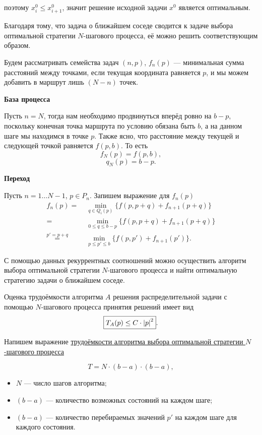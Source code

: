 поэтому $x_i^0 \le x_{i+1}^0$, значит решение исходной задачи $x^0$ является оптимальным.


Благодаря тому, что задача о ближайшем соседе сводится к задаче выбора оптимальной стратегии $N$-шагового процесса, её можно решить соответствующим образом.

Будем рассматривать семейства задач $(n, p)$, $f_n(p)$ --- минимальная сумма расстояний между точками, если текущая координата равняется $p$, и мы можем добавить в маршрут лишь $(N-n)$ точек.

\bigskip

\textbf{База процесса}

Пусть $n = N$, тогда нам необходимо продвинуться вперёд ровно на $b-p$, поскольку конечная точка маршрута по условию обязана быть $b$, а на данном шаге мы находимся в точке $p$. Также ясно, что расстояние между текущей и следующей точкой равняется $f(p, b)$. То есть 
\[
f_N(p) = f(p, b),
\]
\[
q_N(p) = b - p.
\]

\bigskip

\textbf{Переход}

Пусть $n = 1 \dots N-1$, $p \in P_n$. Запишем выражение для $f_n(p)$
\begin{align*}
	f_n(p) =& \; \min_{q \in Q_i(p)} \{f(p, p + q) + f_{n+1}(p+q)\} \\
	=& \; \min_{0 \le q \le b - p} \{f(p, p + q) + f_{n+1}(p+q)\} \\
	\stackrel{p' = p + q}{=}& \; \min_{p \le p' \le b} \{f(p, p') + f_{n+1}(p')\}.
\end{align*}

С помощью данных рекуррентных соотношений можно осуществить алгоритм выбора оптимальной стратегии $N$-шагового процесса и найти оптимальную стратегию задачи о ближайшем соседе.

\fact

Оценка трудоёмкости алгоритма $A$ решения распределительной задачи с помощью $N$-шагового процесса принятия решений имеет вид
\[
\boxed{T_A(p) \le C \cdot \abs{p}^2}.
\]

\prooof

Напишем выражение \hyperref[fact:n_step_complexity]{трудоёмкости алгоритма выбора оптимальной стратегии $N$-шагового процесса}

\[
T = N \cdot (b - a) \cdot (b - a),
\]

\begin{itemize}[nosep]
	\item $N$ --- число шагов алгоритма;
	
	\item $(b-a)$ --- количество возможных состояний на каждом шаге;
	
	\item $(b-a)$ --- количество перебираемых значений $p'$ на каждом шаге для каждого состояния.
\end{itemize}

